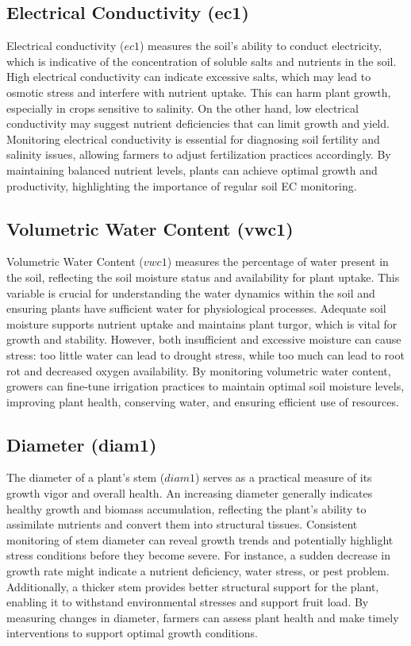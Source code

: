 \subsection{Electrical Conductivity (ec1)}

Electrical conductivity (\( ec1 \)) measures the soil's ability to conduct electricity, which is indicative of the concentration of soluble salts and nutrients in the soil. High electrical conductivity can indicate excessive salts, which may lead to osmotic stress and interfere with nutrient uptake. This can harm plant growth, especially in crops sensitive to salinity. On the other hand, low electrical conductivity may suggest nutrient deficiencies that can limit growth and yield. Monitoring electrical conductivity is essential for diagnosing soil fertility and salinity issues, allowing farmers to adjust fertilization practices accordingly. By maintaining balanced nutrient levels, plants can achieve optimal growth and productivity, highlighting the importance of regular soil EC monitoring.

\subsection{Volumetric Water Content (vwc1)}

Volumetric Water Content (\( vwc1 \)) measures the percentage of water present in the soil, reflecting the soil moisture status and availability for plant uptake. This variable is crucial for understanding the water dynamics within the soil and ensuring plants have sufficient water for physiological processes. Adequate soil moisture supports nutrient uptake and maintains plant turgor, which is vital for growth and stability. However, both insufficient and excessive moisture can cause stress: too little water can lead to drought stress, while too much can lead to root rot and decreased oxygen availability. By monitoring volumetric water content, growers can fine-tune irrigation practices to maintain optimal soil moisture levels, improving plant health, conserving water, and ensuring efficient use of resources.

\subsection{Diameter (diam1)}

The diameter of a plant's stem (\( diam1 \)) serves as a practical measure of its growth vigor and overall health. An increasing diameter generally indicates healthy growth and biomass accumulation, reflecting the plant's ability to assimilate nutrients and convert them into structural tissues. Consistent monitoring of stem diameter can reveal growth trends and potentially highlight stress conditions before they become severe. For instance, a sudden decrease in growth rate might indicate a nutrient deficiency, water stress, or pest problem. Additionally, a thicker stem provides better structural support for the plant, enabling it to withstand environmental stresses and support fruit load. By measuring changes in diameter, farmers can assess plant health and make timely interventions to support optimal growth conditions.

